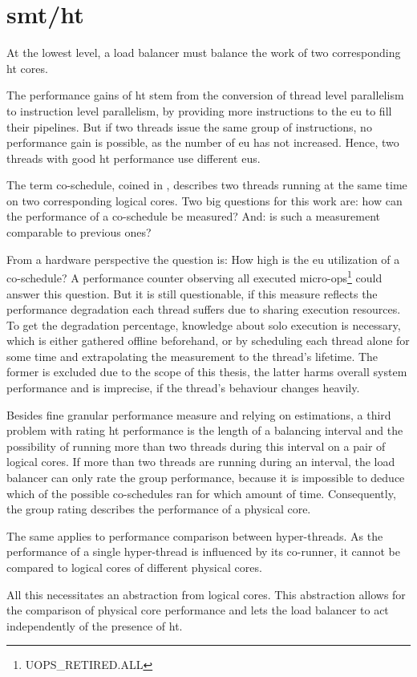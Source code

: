 \section{\gls{smt}/\gls{ht}}
\label{design:smt}


At the lowest level, a load balancer must balance the work of two corresponding
\gls{ht} cores.

The performance gains of \gls{ht} stem from the conversion of thread level
parallelism to instruction level parallelism, by providing more instructions to
the \gls{eu} to fill their pipelines.
But if two threads issue the same group of instructions, no performance gain is
possible, as the number of \gls{eu} has not increased.
Hence, two threads with good \gls{ht} performance use different \gls{eu}s.

The term co-schedule, coined in \cite{snavely_symbiotic_2000}, describes two
threads running at the same time on two corresponding logical cores.
Two big questions for this work are: how can the performance of a co-schedule be
measured? And: is such a measurement comparable to previous ones?

From a hardware perspective the question is: How high is the \gls{eu}
utilization of a co-schedule?
A performance counter observing all executed
micro-ops\footnote{UOPS\_RETIRED.ALL} could answer this question.
But it is still questionable, if this measure reflects the performance
degradation each thread suffers due to sharing execution resources.
To get the degradation percentage, knowledge about solo execution is necessary,
which is either gathered offline beforehand, or by scheduling each thread alone
for some time and extrapolating the measurement to the thread's lifetime.
The former is excluded due to the scope of this thesis, the latter harms
overall system performance and is imprecise, if the thread's behaviour changes
heavily.

Besides fine granular performance measure and relying on estimations, a third
problem with rating \gls{ht} performance is the length of a balancing interval
and the possibility of running more than two threads during this interval on a
pair of logical cores.
If more than two threads are running during an interval, the load balancer can
only rate the group performance, because it is impossible to deduce which
of the possible co-schedules ran for which amount of time.
Consequently, the group rating describes the performance of a physical core.

The same applies to performance comparison between hyper-threads. As the
performance of a single hyper-thread is influenced by its co-runner, it cannot
be compared to logical cores of different physical cores.

All this necessitates an abstraction from logical cores.
This abstraction allows for the comparison of physical core performance and
lets the load balancer to act independently of the presence of \gls{ht}.
